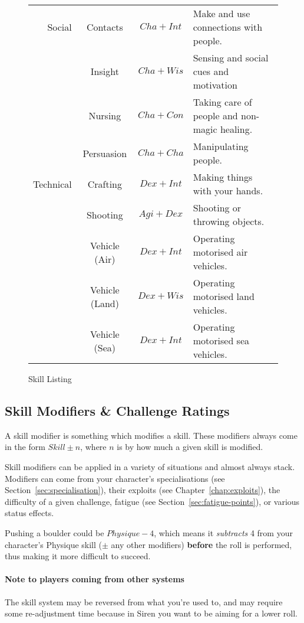 \begin{figure}
\begin{tabular}{r | c | c | l}
    Social    & Contacts         & $Cha+Int$ & Make and use connections with people.         \\
              & Insight          & $Cha+Wis$ & Sensing and social cues and motivation        \\
              & Nursing          & $Cha+Con$ & Taking care of people and non-magic healing.  \\
              & Persuasion       & $Cha+Cha$ & Manipulating people.                          \\\hline
    Technical & Crafting         & $Dex+Int$ & Making things with your hands.                \\
              & Shooting         & $Agi+Dex$ & Shooting or throwing objects.                 \\
              & Vehicle (Air)    & $Dex+Int$ & Operating motorised air vehicles.             \\
              & Vehicle (Land)   & $Dex+Wis$ & Operating motorised land vehicles.            \\
              & Vehicle (Sea)    & $Dex+Int$ & Operating motorised sea vehicles.             \\
\end{tabular}
\caption{Skill Listing}
\label{fig:skills}
\end{figure}

\subsection{Skill Modifiers \& Challenge Ratings}
A skill modifier is something which modifies a skill.
These modifiers always come in the form $Skill \pm n$, where $n$ is by how much a given skill is modified.

Skill modifiers can be applied in a variety of situations and almost always stack.
Modifiers can come from your character's specialisations (see Section~\ref{sec:specialisation}), their exploits (see Chapter~\ref{chap:exploits}), the difficulty of a given challenge, fatigue (see Section~\ref{sec:fatigue-points}), or various status effects.

Pushing a boulder could be $\mathit{Physique} - 4$, which means it \textit{subtracts} 4 from your character's Physique skill ($\pm$ any other modifiers) \textbf{before} the roll is performed, thus making it more difficult to succeed.

\paragraph{Note to players coming from other systems} The skill system may be reversed from what you're used to, and may require some re-adjustment time because in Siren you want to be aiming for a lower roll.
\newpage

